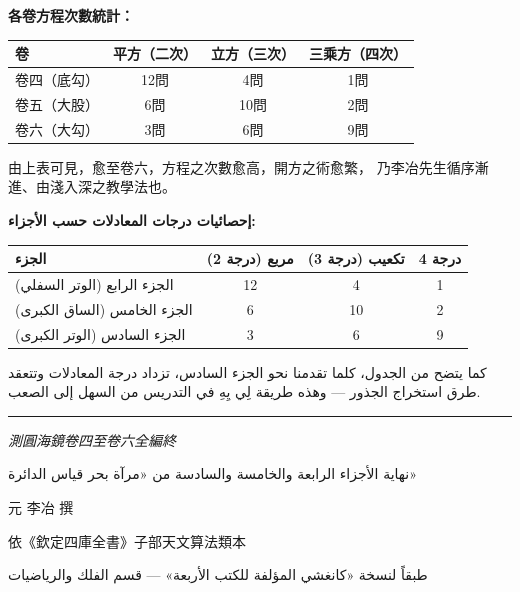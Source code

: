 \documentclass[11pt,a4paper]{article}
\begin{document}
\noindent
\begin{minipage}[t]{0.48\textwidth}
\textbf{各卷方程次數統計：}

\begin{center}
\begin{tabular}{lccc}
\toprule
\textbf{卷} & \textbf{平方（二次）} & \textbf{立方（三次）} & \textbf{三乘方（四次）} \\
\midrule
卷四（底勾） & 12問 & 4問 & 1問 \\
卷五（大股） & 6問 & 10問 & 2問 \\
卷六（大勾） & 3問 & 6問 & 9問 \\
\bottomrule
\end{tabular}
\end{center}

由上表可見，愈至卷六，方程之次數愈高，開方之術愈繁，
乃李冶先生循序漸進、由淺入深之教學法也。
\end{minipage}
\hfill
\begin{minipage}[t]{0.48\textwidth}
\arabicfont\beginR
\textbf{إحصائيات درجات المعادلات حسب الأجزاء:}

\begin{center}
\begin{tabular}{lccc}
\toprule
\textbf{الجزء} & \textbf{مربع (درجة 2)} & \textbf{تكعيب (درجة 3)} & \textbf{درجة 4} \\
\midrule
الجزء الرابع (الوتر السفلي) & 12 & 4 & 1 \\
الجزء الخامس (الساق الكبرى) & 6 & 10 & 2 \\
الجزء السادس (الوتر الكبرى) & 3 & 6 & 9 \\
\bottomrule
\end{tabular}
\end{center}

كما يتضح من الجدول، كلما تقدمنا نحو الجزء السادس، تزداد
درجة المعادلات وتتعقد طرق استخراج الجذور — وهذه طريقة
لِي يِهِ في التدريس من السهل إلى الصعب.
\endR
\end{minipage}

\vspace{1cm}
\begin{center}
\rule{0.3\textwidth}{0.4pt}

\vspace{0.3cm}

{\large\itshape 測圓海鏡卷四至卷六全編終}

\vspace{0.2cm}

{\arabicfont\beginR\large نهاية الأجزاء الرابعة والخامسة والسادسة من «مرآة بحر قياس الدائرة»\endR}

\vspace{0.3cm}

{\small 元 \quad 李冶 \quad 撰}

\vspace{0.2cm}

{\small\color{notecolor} 依《欽定四庫全書》子部天文算法類本}

\vspace{0.2cm}

{\small\arabicfont\beginR\color{notecolor}
طبقاً لنسخة «كانغشي المؤلفة للكتب الأربعة» — قسم الفلك والرياضيات
\endR}
\end{center}
\end{document}
